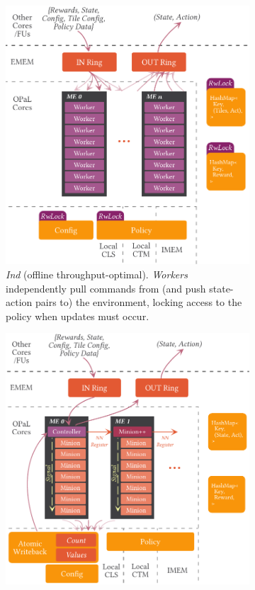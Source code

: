 \documentclass[sigconf,natbib=false]{acmart}
\newcommand{\Indfw}{\emph{Ind}}
\begin{document}
\begin{figure}
	\centering
	\begin{subfigure}{0.45\linewidth}
		\centering
		\includegraphics[keepaspectratio, width=0.9\linewidth]{figures/ind}
		\caption{\Indfw{} (offline throughput-optimal). \emph{Workers} independently pull commands from (and push state-action pairs to) the environment, locking access to the policy when updates must occur.\label{fig:single-and-parallel:single}}
	\end{subfigure}
	\hspace{0.04\linewidth}
	\begin{subfigure}{0.45\linewidth}
		\centering
		\includegraphics[keepaspectratio, width=0.9\linewidth]{figures/coop}

\end{subfigure}
\end{figure}
\end{document}
